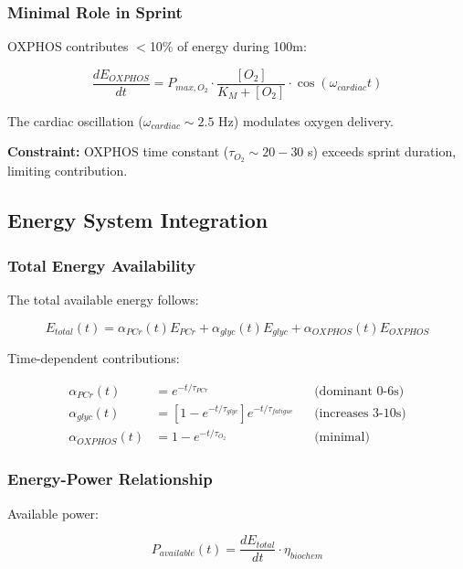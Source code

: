 \subsubsection{Minimal Role in Sprint}

OXPHOS contributes $<$10\% of energy during 100m:

\begin{equation}
\frac{dE_{OXPHOS}}{dt} = P_{max,O_2} \cdot \frac{[O_2]}{K_M + [O_2]} \cdot \cos(\omega_{cardiac} t)
\label{eq:oxphos_contribution}
\end{equation}

The cardiac oscillation ($\omega_{cardiac} \sim 2.5$ Hz) modulates oxygen delivery.

\textbf{Constraint:} OXPHOS time constant ($\tau_{O_2} \sim 20-30$ s) exceeds sprint duration, limiting contribution.

\subsection{Energy System Integration}

\subsubsection{Total Energy Availability}

The total available energy follows:

\begin{equation}
E_{total}(t) = \alpha_{PCr}(t) E_{PCr} + \alpha_{glyc}(t) E_{glyc} + \alpha_{OXPHOS}(t) E_{OXPHOS}
\label{eq:total_energy}
\end{equation}

Time-dependent contributions:

\begin{align}
\alpha_{PCr}(t) &= e^{-t/\tau_{PCr}} && \text{(dominant 0-6s)} \\
\alpha_{glyc}(t) &= \left[1 - e^{-t/\tau_{glyc}}\right] e^{-t/\tau_{fatigue}} && \text{(increases 3-10s)} \\
\alpha_{OXPHOS}(t) &= 1 - e^{-t/\tau_{O_2}} && \text{(minimal)}
\end{align}

\subsubsection{Energy-Power Relationship}

Available power:

\begin{equation}
P_{available}(t) = \frac{dE_{total}}{dt} \cdot \eta_{biochem}
\label{eq:power_available}
\end{equation}


